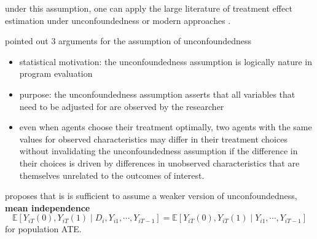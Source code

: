 \documentclass[twoside]{article}
\begin{document}
under this assumption, one can apply the large literature of treatment effect estimation under unconfoundedness \citep{imbens2004nonparametric} or modern approaches \citep{bang2005doubly,chernozhukov2017double,athey2018approximate}.

\citet{imbens2004nonparametric} pointed out 3 arguments for the assumption of unconfoundedness
\begin{itemize}
    \item statistical motivation: the unconfoundedness assumption is logically nature in program evaluation 
    \item purpose: the unconfoundedness assumption asserts that all variables that need to be adjusted for are observed by the researcher
    \item even when agents choose their treatment optimally, two agents with the same values for observed characteristics may differ in their treatment choices without invalidating the unconfoundedness assumption if the difference in their choices is driven by differences in unobserved characteristics that are themselves unrelated to the outcomes of interest.
\end{itemize}

\citet{imbens2004nonparametric} proposes that is is sufficient to assume a weaker version of unconfoundedness, \textbf{mean independence} $$ \mathbb{E}\left[Y_{iT}(0),Y_{iT}(1) \mid D_i, Y_{i1},\cdots,Y_{iT-1}\right] = \mathbb{E}\left[ Y_{iT}(0),Y_{iT}(1) \mid Y_{i1},\cdots,Y_{iT-1} \right] $$
for population ATE. 
\end{document}
